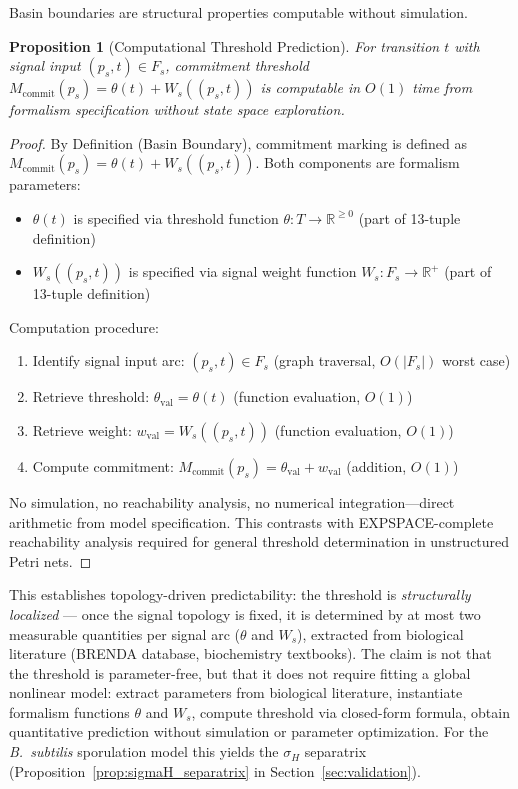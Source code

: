 \documentclass[10pt,letterpaper]{article}
\newtheorem{proposition}{Proposition}
\begin{document}
Basin boundaries are structural properties computable without simulation.

\begin{proposition}[Computational Threshold Prediction]
For transition $t$ with signal input $(p_s,t) \in F_s$, commitment threshold $M_{\text{commit}}(p_s) = \theta(t) + W_s((p_s,t))$ is computable in $O(1)$ time from formalism specification without state space exploration.
\end{proposition}

\begin{proof}
By Definition (Basin Boundary), commitment marking is defined as $M_{\text{commit}}(p_s) = \theta(t) + W_s((p_s,t))$. Both components are formalism parameters:
\begin{itemize}
\item $\theta(t)$ is specified via threshold function $\theta: T \rightarrow \mathbb{R}^{\geq 0}$ (part of 13-tuple definition)
\item $W_s((p_s,t))$ is specified via signal weight function $W_s: F_s \rightarrow \mathbb{R}^+$ (part of 13-tuple definition)
\end{itemize}

Computation procedure:
\begin{enumerate}
\item Identify signal input arc: $(p_s,t) \in F_s$ (graph traversal, $O(|F_s|)$ worst case)
\item Retrieve threshold: $\theta_{\text{val}} = \theta(t)$ (function evaluation, $O(1)$)
\item Retrieve weight: $w_{\text{val}} = W_s((p_s,t))$ (function evaluation, $O(1)$)
\item Compute commitment: $M_{\text{commit}}(p_s) = \theta_{\text{val}} + w_{\text{val}}$ (addition, $O(1)$)
\end{enumerate}

No simulation, no reachability analysis, no numerical integration---direct arithmetic from model specification. This contrasts with EXPSPACE-complete reachability analysis required for general threshold determination in unstructured Petri nets.
\end{proof}

This establishes topology-driven predictability: the threshold is \textit{structurally localized} --- once the signal topology is fixed, it is determined by at most two measurable quantities per signal arc ($\theta$ and $W_s$), extracted from biological literature (BRENDA database, biochemistry textbooks). The claim is not that the threshold is parameter-free, but that it does not require fitting a global nonlinear model: extract parameters from biological literature, instantiate formalism functions $\theta$ and $W_s$, compute threshold via closed-form formula, obtain quantitative prediction without simulation or parameter optimization. For the \textit{B.~subtilis} sporulation model this yields the $\sigma_H$ separatrix (Proposition~\ref{prop:sigmaH_separatrix} in Section~\ref{sec:validation}).
\end{document}
